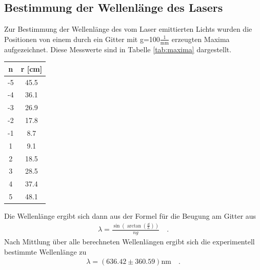 \documentclass[]{scrartcl}
\begin{document}
\subsection{Bestimmung der Wellenlänge des Lasers}
Zur Bestimmung der Wellenlänge des vom Laser emittierten Lichts wurden die Positionen von einem durch ein Gitter mit g=100$\frac{1}{\si{\milli\metre}}$ erzeugten Maxima aufgezeichnet. Diese Messwerte sind in Tabelle \ref{tab:maxima} dargestellt. \\
\begin{center}
	\begin{tabular}{|c|c|}
		\hline n & r [cm] \\
		\hline -5 & 45.5 \\
			   -4 & 36.1 \\
			   -3 & 26.9 \\
			   -2 & 17.8 \\
			   -1 & 8.7 \\
			    1 & 9.1 \\
			    2 & 18.5 \\
			    3 & 28.5 \\
			    4 & 37.4 \\
			    5 & 48.1 \\
		\hline
	\end{tabular}
	\label{tab:maxima}
\end{center}
Die Wellenlänge ergibt sich dann aus der Formel für die Beugung am Gitter aus
\begin{align}
\lambda = \frac{\sin\left(\arctan\left( \frac{d}{L}\right) \right) }{ng}\quad.
\end{align}
Nach Mittlung über alle berechneten Wellenlängen ergibt sich die experimentell bestimmte Wellenlänge zu
\begin{align*}
\lambda = (636.42 \pm 360.59)\si{\nano\metre}\quad.
\end{align*}
\end{document}
